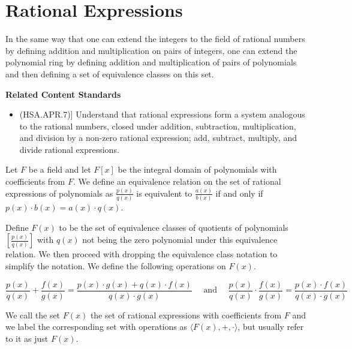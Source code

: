 \documentclass[
]{book}
\providecommand{\tightlist}{%
  \setlength{\itemsep}{0pt}\setlength{\parskip}{0pt}}
\newenvironment{standards}{}{}
\theoremstyle{definition}
\theoremstyle{definition}
\theoremstyle{definition}
\theoremstyle{definition}
\theoremstyle{remark}
\begin{document}
\hypertarget{rational-expressions}{%
\section{Rational Expressions}\label{rational-expressions}}

In the same way that one can extend the integers to the field of rational numbers by defining addition and multiplication on pairs of integers, one can extend the polynomial ring by defining addition and multiplication of pairs of polynomials and then defining a set of equivalence classes on this set.

\begin{standards}

\begin{center}
\textbf{Related Content Standards}

\end{center}

\begin{itemize}
\tightlist
\item
  (HSA.APR.7){]} Understand that rational expressions form a system analogous to the rational numbers, closed under addition, subtraction, multiplication, and division by a non-zero rational expression; add, subtract, multiply, and divide rational expressions.
\end{itemize}

\end{standards}

Let \(F\) be a field and let \(F[x]\) be the integral domain of polynomials with coefficients from \(F\). We define an equivalence relation on the set of rational expressions of polynomials as \(\frac{p(x)}{q(x)}\) is equivalent to \(\frac{a(x)}{b(x)}\) if and only if \(p(x) \cdot b(x)=a(x)\cdot q(x)\).

Define \(F(x)\) to be the set of equivalence classes of quotients of polynomials \(\left[\frac{p(x)}{q(x)}\right]\) with \(q(x)\) not being the zero polynomial under this equivalence relation. We then proceed with dropping the equivalence class notation to simplify the notation. We define the following operations on \(F(x)\).

\[\frac{p(x)}{q(x)} + \frac{f(x)}{g(x)} = \frac{p(x)\cdot g(x) + q(x) \cdot f(x)}{q(x)\cdot g(x)} \quad \mbox{ and } \quad \frac{p(x)}{q(x)} \cdot \frac{f(x)}{g(x)} = \frac{p(x) \cdot f(x)}{q(x)\cdot g(x)}\]

We call the set \(F(x)\) the set of rational expressions with coefficients from \(F\) and we label the corresponding set with operations as \(\langle F(x),+,\cdot\rangle\), but usually refer to it as just \(F(x)\).
\end{document}
